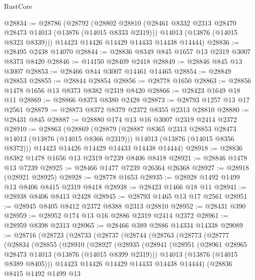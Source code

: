 \begin{lexlean}{RustCore}
\begin{coremodule}
@28834 := @28786
    (@28792
      (@28802
        @28810
        (@28461 @8332 @2313 @28470 @28473 @14013 (@13876 (@14015 @8333 @2319)))
        @14013
        (@13876 (@14015 @8323 @8339)))
      @14423
      @14426
      @14429
      @14433
      @14438
      @14444)
@28836 := @28495 @2438 @14070
@28844 := @28836 @8349 @845 @1657 @13 @2319 @3007 @8373 @8420
@28846 := @14150 @28409 @2418
@28849 := @28846 @845 @13 @3007
@28853 := @28466 @844 @3007 @14461 @14465
@28854 := @28849 @28853
@28855 := @28844 @28854
@28856 := @28778 @1650
@28863 := @28856 @1478 @1656 @13 @8373 @8382 @2319 @8420
@28866 := @28423 @1649 @18 @11
@28869 := @28866 @8373 @8380 @2428
@28873 := @28793 @1257 @13 @17 @2561
@28879 := @28873 @8372 @8379 @2372 @8355 @2313 @28810
@28880 := @28431 @845
@28887 := @28880 @174 @13 @16 @3007 @2319 @2414 @2372
@28910 := @28863
    (@28869
      (@28879
        (@28887 @8365 @2313 @28853 @28473 @14013 (@13876 (@14015 @8366 @2319)))
        @14013
        (@13876 (@14015 @8356 @8372)))
      @14423
      @14426
      @14429
      @14433
      @14438
      @14444)
@28918 := @28836 @8382 @1478 @1656 @13 @2319 @7239 @8406 @8418
@28921 := @28846 @1478 @13 @7239
@28925 := @28466 @1477 @7239 @26364 @26368
@28927 := @28918 (@28921 @28925)
@28928 := @28778 @1653
@28935 := @28928 @1492 @1499 @13 @8406 @8415 @2319 @8418
@28938 := @28423 @1466 @18 @11
@28941 := @28938 @8406 @8413 @2428
@28945 := @28793 @1465 @13 @17 @2561
@28951 := @28945 @8405 @8412 @2372 @8388 @2313 @28810
@28952 := @28431 @390
@28959 := @28952 @174 @13 @16 @2886 @2319 @2414 @2372
@28961 := @28959 @8398 @2313
@28965 := @28466 @389 @2886 @14334 @14338
@29089 := @28716
    (@28723
      (@28733
        (@28737
          (@28744
            (@28763
              (@28773
                (@28777
                  (@28834
                    (@28855
                      (@28910
                        (@28927
                          (@28935
                            (@28941
                              (@28951
                                (@28961 @28965 @28473 @14013 (@13876 (@14015 @8399 @2319)))
                                @14013
                                (@13876 (@14015 @8389 @8405)))
                              @14423
                              @14426
                              @14429
                              @14433
                              @14438
                              @14444)
                            (@28836
                              @8415
                              @1492
                              @1499
                              @13

\end{coremodule}
\end{lexlean}
